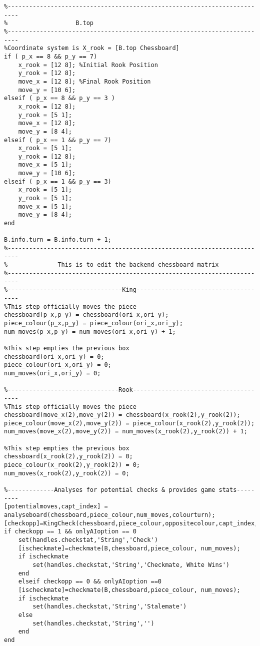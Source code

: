\documentclass{article}
\begin{document}
\begin{lstlisting}
%-------------------------------------------------------------------------
%                   B.top
%-------------------------------------------------------------------------
%Coordinate system is X_rook = [B.top Chessboard]
if ( p_x == 8 && p_y == 7)
    x_rook = [12 8]; %Initial Rook Position
    y_rook = [12 8];
    move_x = [12 8]; %Final Rook Position
    move_y = [10 6];
elseif ( p_x == 8 && p_y == 3 )
    x_rook = [12 8];
    y_rook = [5 1];
    move_x = [12 8];
    move_y = [8 4];
elseif ( p_x == 1 && p_y == 7)
    x_rook = [5 1];
    y_rook = [12 8];
    move_x = [5 1];
    move_y = [10 6];
elseif ( p_x == 1 && p_y == 3)
    x_rook = [5 1];
    y_rook = [5 1];
    move_x = [5 1];
    move_y = [8 4];
end

B.info.turn = B.info.turn + 1;
%-------------------------------------------------------------------------
%              This is to edit the backend chessboard matrix
%-------------------------------------------------------------------------
%--------------------------------King-------------------------------------
%This step officially moves the piece
chessboard(p_x,p_y) = chessboard(ori_x,ori_y);
piece_colour(p_x,p_y) = piece_colour(ori_x,ori_y);
num_moves(p_x,p_y) = num_moves(ori_x,ori_y) + 1;

%This step empties the previous box
chessboard(ori_x,ori_y) = 0;
piece_colour(ori_x,ori_y) = 0;
num_moves(ori_x,ori_y) = 0;

%-------------------------------Rook--------------------------------------
%This step officially moves the piece
chessboard(move_x(2),move_y(2)) = chessboard(x_rook(2),y_rook(2));
piece_colour(move_x(2),move_y(2)) = piece_colour(x_rook(2),y_rook(2));
num_moves(move_x(2),move_y(2)) = num_moves(x_rook(2),y_rook(2)) + 1;

%This step empties the previous box
chessboard(x_rook(2),y_rook(2)) = 0;
piece_colour(x_rook(2),y_rook(2)) = 0;
num_moves(x_rook(2),y_rook(2)) = 0;

%-------------Analyses for potential checks & provides game stats---------
[potentialmoves,capt_index] = analyseboard(chessboard,piece_colour,num_moves,colourturn);
[checkopp]=KingCheck(chessboard,piece_colour,oppositecolour,capt_index,potentialmoves);
if checkopp == 1 && onlyAIoption == 0
    set(handles.checkstat,'String','Check')
    [ischeckmate]=checkmate(B,chessboard,piece_colour, num_moves);
    if ischeckmate
        set(handles.checkstat,'String','Checkmate, White Wins')
    end
    elseif checkopp == 0 && onlyAIoption ==0
    [ischeckmate]=checkmate(B,chessboard,piece_colour, num_moves);
    if ischeckmate
        set(handles.checkstat,'String','Stalemate')
    else
        set(handles.checkstat,'String','')
    end
end


\end{lstlisting}
\end{document}
